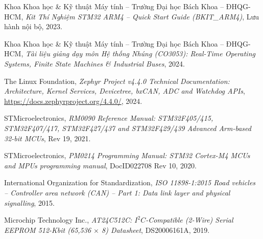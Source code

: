 \begin{enumerate}[label={[\arabic*]}, leftmargin=2.2em, itemsep=4pt]
    \item Khoa Khoa học \& Kỹ thuật Máy tính -- Trường Đại học Bách Khoa -- ĐHQG-HCM, \textit{Kit Thí Nghiệm STM32 ARM4 -- Quick Start Guide (BKIT\_ARM4)}, Lưu hành nội bộ, 2023.
    \item Khoa Khoa học \& Kỹ thuật Máy tính -- Trường Đại học Bách Khoa -- ĐHQG-HCM, \textit{Tài liệu giảng dạy môn Hệ thống Nhúng (CO3053): Real-Time Operating Systems, Finite State Machines \& Industrial Buses}, 2024.
    \item The Linux Foundation, \textit{Zephyr Project v4.4.0 Technical Documentation: Architecture, Kernel Services, Devicetree, bxCAN, ADC and Watchdog APIs}, \url{https://docs.zephyrproject.org/4.4.0/}, 2024.
    \item STMicroelectronics, \textit{RM0090 Reference Manual: STM32F405/415, STM32F407/417, STM32F427/437 and STM32F429/439 Advanced Arm-based 32-bit MCUs}, Rev 19, 2021.
    \item STMicroelectronics, \textit{PM0214 Programming Manual: STM32 Cortex-M4 MCUs and MPUs programming manual}, DocID022708 Rev 10, 2020.
    \item International Organization for Standardization, \textit{ISO 11898-1:2015 Road vehicles -- Controller area network (CAN) -- Part 1: Data link layer and physical signalling}, 2015.
    \item Microchip Technology Inc., \textit{AT24C512C: $I^2C$-Compatible (2-Wire) Serial EEPROM 512-Kbit (65,536 $\times$ 8) Datasheet}, DS20006161A, 2019.
\end{enumerate}
